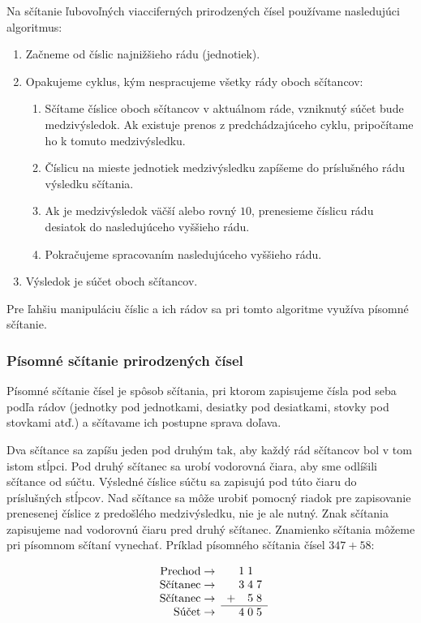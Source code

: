 \documentclass{article}
\begin{document}
Na sčítanie ľubovoľných viacciferných prirodzených čísel používame nasledujúci algoritmus:
\begin{enumerate}[label=\arabic*)]
  \item Začneme od číslic najnižšieho rádu (jednotiek).
  \item Opakujeme cyklus, kým nespracujeme všetky rády oboch sčítancov:
  \begin{enumerate}
    \item Sčítame číslice oboch sčítancov v aktuálnom ráde, vzniknutý súčet bude medzivýsledok. Ak existuje prenos z predchádzajúceho cyklu, pripočítame ho k tomuto medzivýsledku.
    \item Číslicu na mieste jednotiek medzivýsledku zapíšeme do príslušného rádu výsledku sčítania.
    \item Ak je medzivýsledok väčší alebo rovný \(10\), prenesieme číslicu rádu desiatok do nasledujúceho vyššieho rádu.
    \item Pokračujeme spracovaním nasledujúceho vyššieho rádu.
  \end{enumerate}
  \item Výsledok je súčet oboch sčítancov.
\end{enumerate}
Pre ľahšiu manipuláciu číslic a ich rádov sa pri tomto algoritme využíva písomné sčítanie.

\subsubsection{Písomné sčítanie prirodzených čísel} 

Písomné sčítanie čísel je spôsob sčítania, pri ktorom zapisujeme čísla pod seba podľa rádov (jednotky pod jednotkami, desiatky pod desiatkami, stovky pod stovkami atď.) a sčítavame ich postupne sprava doľava.

Dva sčítance sa zapíšu jeden pod druhým tak, aby každý rád sčítancov bol v tom istom stĺpci. Pod druhý sčítanec sa urobí vodorovná čiara, aby sme odlíšili sčítance od súčtu. Výsledné číslice súčtu sa zapisujú pod túto čiaru do príslušných stĺpcov. Nad sčítance sa môže urobiť pomocný riadok pre zapisovanie prenesenej číslice z predošlého medzivýsledku, nie je ale nutný. Znak sčítania zapisujeme nad vodorovnú čiaru pred druhý sčítanec. Znamienko sčítania môžeme pri písomnom sčítaní vynechať. Príklad písomného sčítania čísel \(347 + 58\):
\begin{table}[H]
  \centering
  \[
  \begin{array}{r}
    \text{Prechod} \rightarrow \\
    \text{Sčítanec} \rightarrow \\
    \text{Sčítanec} \rightarrow \\
    \text{Súčet} \rightarrow \\
  \end{array}
  \begin{array}{c@{\;}c@{\;}c@{\;}c}
      & 1 & 1 &  \\
      & 3 & 4 & 7 \\
    + &   & 5 & 8 \\
    \hline
      & 4 & 0 & 5
  \end{array}
  \]
\end{table}
\end{document}
